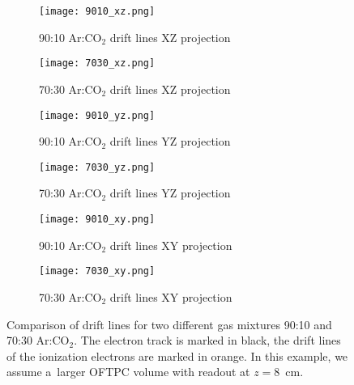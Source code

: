 			\begin{figure}
				\centering
				\begin{subfigure}[t]{0.48\textwidth}
					\centering
					\texttt{[image: 9010\_xz.png]}
					\caption{90:10 Ar:CO$_2$ drift lines XZ projection}
				\end{subfigure}
				\hfill
				\begin{subfigure}[t]{0.48\textwidth}
					\centering
					\texttt{[image: 7030\_xz.png]}
					\caption{70:30 Ar:CO$_2$ drift lines XZ projection}
				\end{subfigure}
				\hfill
				\begin{subfigure}[t]{0.48\textwidth}
					\centering
					\texttt{[image: 9010\_yz.png]}
					\caption{90:10 Ar:CO$_2$ drift lines YZ projection}
				\end{subfigure}
				\hfill
				\begin{subfigure}[t]{0.48\textwidth}
					\centering
					\texttt{[image: 7030\_yz.png]}
					\caption{70:30 Ar:CO$_2$ drift lines YZ projection}
				\end{subfigure}
				\hfill
				\begin{subfigure}[t]{0.48\textwidth}
					\centering
					\texttt{[image: 9010\_xy.png]}
					\caption{90:10 Ar:CO$_2$ drift lines XY projection}
				\end{subfigure}
				\hfill
				\begin{subfigure}[t]{0.48\textwidth}
					\centering
					\texttt{[image: 7030\_xy.png]}
					\caption{70:30 Ar:CO$_2$ drift lines XY projection}
				\end{subfigure}
				\caption{Comparison of drift lines for two different gas mixtures 90:10 and 70:30 Ar:CO$_2$. The electron track is marked in black, the drift lines of the ionization electrons are marked in orange. In this example, we assume a~larger \ac{OFTPC} volume with readout at $z = 8$~cm. }
				\label{fig:microfirst}
			\end{figure}
			
